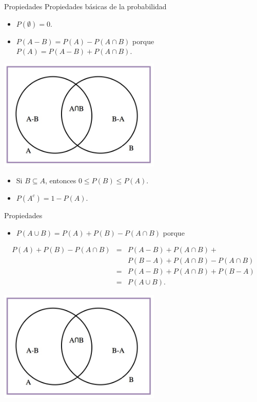 \documentclass[
  ignorenonframetext,
]{beamer}
\providecommand{\tightlist}{%
  \setlength{\itemsep}{0pt}\setlength{\parskip}{0pt}}
\begin{document}
\begin{frame}{Propiedades}
\protect\hypertarget{propiedades-8}{}
Propiedades básicas de la probabilidad

\begin{itemize}
\item
  \(P(\emptyset)=0\).
\item
  \(P(A-B)=P(A)-P(A\cap B)\) porque \(P(A)=P(A-B)+P(A\cap B)\).
\end{itemize}

\includegraphics[width=\textwidth,height=2.08333in]{Images/proba1dibujos/A-B.jpg}

\begin{itemize}
\item
  Si \(B\subseteq A\), entonces \(0\leq P(B)\leq P(A)\).
\item
  \(P(A^c)=1-P(A)\).
\end{itemize}
\end{frame}

\begin{frame}{Propiedades}
\protect\hypertarget{propiedades-9}{}
\begin{itemize}
\tightlist
\item
  \(P(A\cup B)=P(A)+P(B)-P(A\cap B)\) porque
\end{itemize}

\[\begin{eqnarray*}
P(A)+P(B)-P(A\cap B) &=& P(A-B)+P(A\cap B)+\\
 & & P(B-A)+ P(A\cap  B)-P(A\cap  B)\\
&=& P(A-B)+P(A\cap B)+ P(B-A) \\
&=& P(A\cup B).
\end{eqnarray*}\]

\includegraphics[width=\textwidth,height=2.08333in]{Images/proba1dibujos/A-B.jpg}
\end{frame}
\end{document}

